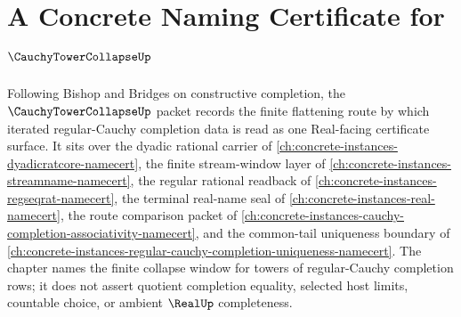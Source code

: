 \chapter{A Concrete Naming Certificate for $\CauchyTowerCollapseUp$}
\label{ch:concrete-instances-cauchy-tower-collapse-namecert}

Following Bishop and Bridges on constructive completion, the $\CauchyTowerCollapseUp$ packet records the finite flattening route by which iterated regular-Cauchy completion data is read as one Real-facing certificate surface. It sits over the dyadic rational carrier of \autoref{ch:concrete-instances-dyadicratcore-namecert}, the finite stream-window layer of \autoref{ch:concrete-instances-streamname-namecert}, the regular rational readback of \autoref{ch:concrete-instances-regseqrat-namecert}, the terminal real-name seal of \autoref{ch:concrete-instances-real-namecert}, the route comparison packet of \autoref{ch:concrete-instances-cauchy-completion-associativity-namecert}, and the common-tail uniqueness boundary of \autoref{ch:concrete-instances-regular-cauchy-completion-uniqueness-namecert}. The chapter names the finite collapse window for towers of regular-Cauchy completion rows; it does not assert quotient completion equality, selected host limits, countable choice, or ambient $\RealUp$ completeness.

